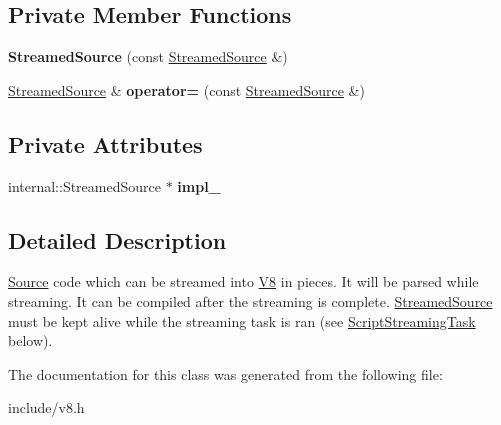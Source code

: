 \subsection*{Private Member Functions}
\begin{DoxyCompactItemize}
\item 
{\bfseries Streamed\+Source} (const \hyperlink{classv8_1_1_script_compiler_1_1_streamed_source}{Streamed\+Source} \&)\hypertarget{classv8_1_1_script_compiler_1_1_streamed_source_ad71bf1290a87bd01ed2d2b4b77e00562}{}\label{classv8_1_1_script_compiler_1_1_streamed_source_ad71bf1290a87bd01ed2d2b4b77e00562}

\item 
\hyperlink{classv8_1_1_script_compiler_1_1_streamed_source}{Streamed\+Source} \& {\bfseries operator=} (const \hyperlink{classv8_1_1_script_compiler_1_1_streamed_source}{Streamed\+Source} \&)\hypertarget{classv8_1_1_script_compiler_1_1_streamed_source_a0c5d7c6e8d02d190dafa4e6e5fa02c6b}{}\label{classv8_1_1_script_compiler_1_1_streamed_source_a0c5d7c6e8d02d190dafa4e6e5fa02c6b}

\end{DoxyCompactItemize}
\subsection*{Private Attributes}
\begin{DoxyCompactItemize}
\item 
internal\+::\+Streamed\+Source $\ast$ {\bfseries impl\+\_\+}\hypertarget{classv8_1_1_script_compiler_1_1_streamed_source_a2155cae2a024035ef3c2d134fc84411d}{}\label{classv8_1_1_script_compiler_1_1_streamed_source_a2155cae2a024035ef3c2d134fc84411d}

\end{DoxyCompactItemize}


\subsection{Detailed Description}
\hyperlink{classv8_1_1_script_compiler_1_1_source}{Source} code which can be streamed into \hyperlink{classv8_1_1_v8}{V8} in pieces. It will be parsed while streaming. It can be compiled after the streaming is complete. \hyperlink{classv8_1_1_script_compiler_1_1_streamed_source}{Streamed\+Source} must be kept alive while the streaming task is ran (see \hyperlink{classv8_1_1_script_compiler_1_1_script_streaming_task}{Script\+Streaming\+Task} below). 

The documentation for this class was generated from the following file\+:\begin{DoxyCompactItemize}
\item 
include/v8.\+h\end{DoxyCompactItemize}

